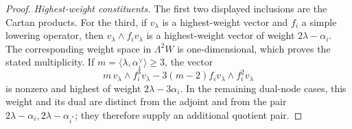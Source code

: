 \documentclass[11pt]{article}
\theoremstyle{remark}
\begin{document}
\begin{proof}
\emph{Highest-weight constituents.}
The first two displayed inclusions are the Cartan products. For the third,
if \(v_\lambda\) is a highest-weight vector and \(f_i\) a simple lowering
operator, then
\(v_\lambda\wedge f_iv_\lambda\) is a highest-weight vector of weight
\(2\lambda-\alpha_i\). The corresponding weight space in \(\Lambda^2W\)
is one-dimensional, which proves the stated multiplicity. If
\(m=\langle\lambda,\alpha_i^\vee\rangle\ge3\), the vector
\[
 m\,v_\lambda\wedge f_i^3v_\lambda
 -3(m-2)f_iv_\lambda\wedge f_i^2v_\lambda
\]
is nonzero and highest of weight \(2\lambda-3\alpha_i\).  In the remaining
dual-node cases, this weight and its dual are distinct from the adjoint and
from the pair \(2\lambda-\alpha_i,2\lambda-\alpha_{i^*}\); they therefore
supply an additional quotient pair.
\end{proof}
\end{document}
